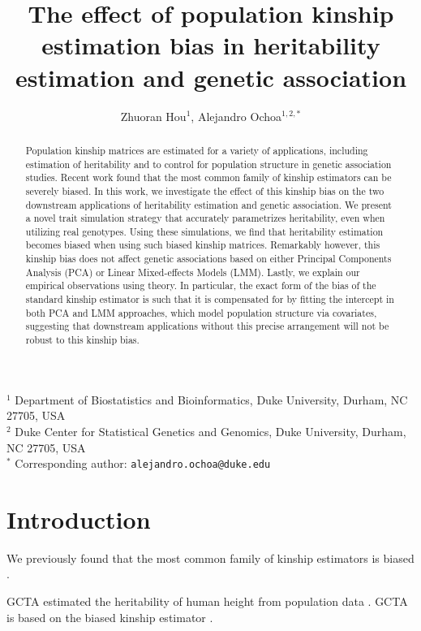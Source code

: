 \documentclass[11pt]{article}
\title{\Large \textbf{The effect of population kinship estimation bias in heritability estimation and genetic association}}
\author{Zhuoran Hou$^1$, Alejandro Ochoa$^{1,2,*}$}
\date{}
\begin{document}
\maketitle

\noindent
$^1$ Department of Biostatistics and Bioinformatics, Duke University, Durham, NC 27705, USA \\
$^2$ Duke Center for Statistical Genetics and Genomics, Duke University, Durham, NC 27705, USA \\
$^*$ Corresponding author: \texttt{alejandro.ochoa@duke.edu}


\begin{abstract}
  Population kinship matrices are estimated for a variety of applications, including estimation of heritability and to control for population structure in genetic association studies.
  Recent work found that the most common family of kinship estimators can be severely biased.
  In this work, we investigate the effect of this kinship bias on the two downstream applications of heritability estimation and genetic association.
  We present a novel trait simulation strategy that accurately parametrizes heritability, even when utilizing real genotypes.
  Using these simulations, we find that heritability estimation becomes biased when using such biased kinship matrices.
  Remarkably however, this kinship bias does not affect genetic associations based on either Principal Components Analysis (PCA) or Linear Mixed-effects Models (LMM).
  Lastly, we explain our empirical observations using theory.
  In particular, the exact form of the bias of the standard kinship estimator is such that it is compensated for by fitting the intercept in both PCA and LMM approaches, which model population structure via covariates, suggesting that downstream applications without this precise arrangement will not be robust to this kinship bias.
\end{abstract}



\clearpage
	
\section{Introduction}

We previously found that the most common family of kinship estimators is biased \citep{ochoa_fst2}.

GCTA estimated the heritability of human height from population data \citep{yang_common_2010}.
GCTA is based on the biased kinship estimator \citep{yang_common_2010,yang_gcta:_2011}.
\end{document}
